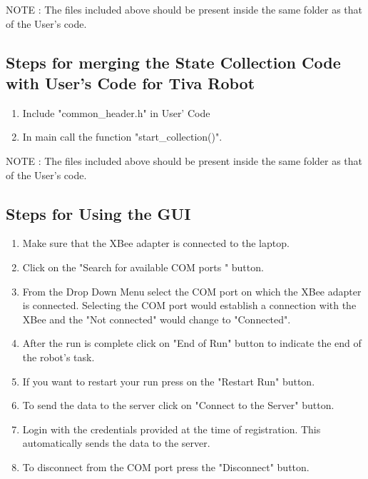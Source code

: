 \documentclass[a4paper,12pt,oneside]{book}
\begin{document}
NOTE : The files included above should be present inside the same folder as that of the User's code.

\subsection{Steps for merging the State Collection Code with User's Code for Tiva Robot}
\begin{enumerate}

\item Include "common\_header.h" in User' Code

\item In main call the function  "start\_collection()".

\end{enumerate}


NOTE : The files included above should be present inside the same folder as that of the User's code.

\subsection{Steps for Using the GUI}
\begin{enumerate}

\item Make sure that the XBee adapter is connected to the laptop.
\item Click on the "Search for available COM ports " button.
\item From the Drop Down Menu select the COM port on which the XBee adapter is connected. Selecting the COM port would establish a connection with the XBee and the "Not connected" would change to "Connected".
\item After the run is complete click on "End of Run" button to indicate the end of the robot's task.
\item If you want to restart your run press on the "Restart Run" button.
\item To send the data to the server click on "Connect to the Server" button.
\item Login with the credentials provided at the time of registration. This automatically sends the data to the server. 
\item To disconnect from the COM port press the "Disconnect" button.

\end{enumerate}
\end{document}
